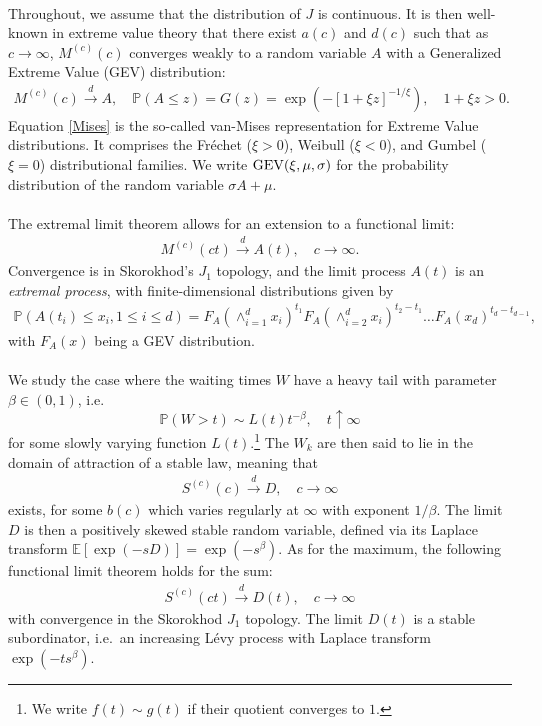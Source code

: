 \documentclass[12pt, a4paper]{article}
\newcommand{\PP}{\mathbb{P}}
\newcommand{\E}{\mathbb{E}}
\newcommand{\1}{\mathbf 1}
\begin{document}
\paragraph{}
Throughout, we assume that the distribution of $J$ is continuous. 
It is then well-known in extreme value theory that there exist $a(c)$ and $d(c)$
such that as $c \to \infty$,
$M^{(c)}(c)$ converges weakly to a random variable $A$ with a
Generalized Extreme Value (GEV) distribution: 
\begin{align}
M^{(c)}(c) \stackrel{d}{\to} A,
\quad \PP(A \le z) = G(z) = \exp\left(-[1+\xi z]^{-1/\xi}\right), 
\quad 1 + \xi z > 0. \label{Mises}
\end{align}
Equation \eqref{Mises} is the so-called van-Mises representation for 
Extreme Value distributions. 
It comprises the Fr\'echet ($\xi>0$), Weibull ($\xi<0$),
and Gumbel ($\xi = 0$) distributional families. 
We write ${\rm GEV}(\xi, \mu, \sigma)$ for the probability 
distribution of the random variable $\sigma A + \mu$. 

\paragraph{}
The extremal limit theorem allows for an extension to a functional
limit: 
\begin{align*}
M^{(c)}(ct)
\stackrel{d}{\to} A(t),
\quad c \to \infty.
\end{align*}
Convergence is in Skorokhod's $J_1$ topology, and the limit
process $A(t)$ is an \emph{extremal process}, with
finite-dimensional distributions given by
\begin{align*}
\PP(A(t_i)\leq x_i,1\leq i \leq d) 
= F_A(\wedge_{i=1}^d x_i)^{t_1} 
F_A(\wedge_{i=2}^d x_i)^{t_2-t_1}
\ldots F_A(x_d)^{t_d-t_{d-1}},
\end{align*}
with $F_A(x)$ being a GEV distribution.

\paragraph{}
We study the case where the waiting times $W$ have a heavy tail with
parameter $\beta \in (0,1)$, i.e.\ 
$$
\PP(W > t) \sim L(t) t^{-\beta}, \quad t \uparrow \infty
$$ 
for some slowly varying function $L(t)$.\footnote{
We write $f(t) \sim g(t)$ if their quotient converges to $1$.
}
The $W_k$ are then said to lie in the 
domain of attraction of a stable law, meaning that 
\begin{align}\label{eq:sclt}
S^{(c)}(c) \overset{d}{\longrightarrow} D, 
\quad c \to \infty
\end{align}
exists, for some $b(c)$ which varies regularly at $\infty$ with exponent 
$1/\beta$. 
The limit $D$ is then a positively skewed stable random variable, defined via
its Laplace transform $\E[\exp(-sD)] = \exp(-s^\beta)$.
As for the maximum, the following functional limit theorem holds for the sum:
\begin{align}
S^{(c)}(ct) \overset{d}{\longrightarrow} D(t), 
\quad c \to \infty
\end{align}
with convergence in the Skorokhod $J_1$ topology.
The limit $D(t)$ is a stable subordinator, i.e.\ an increasing
L\'evy process with Laplace transform $\exp(-t s^\beta)$.
\end{document}
